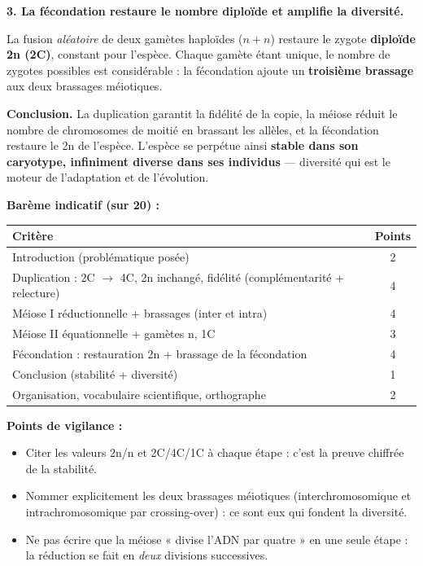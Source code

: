 \documentclass[11pt]{article}
\begin{document}
\begin{corrige}
\textbf{3. La fécondation restaure le nombre diploïde et amplifie la diversité.}

La fusion \emph{aléatoire} de deux gamètes haploïdes ($n + n$) restaure le zygote \textbf{diploïde 2n (2C)}, constant pour l'espèce. Chaque gamète étant unique, le nombre de zygotes possibles est considérable : la fécondation ajoute un \textbf{troisième brassage} aux deux brassages méiotiques.

\textbf{Conclusion.} La duplication garantit la fidélité de la copie, la méiose réduit le nombre de chromosomes de moitié en brassant les allèles, et la fécondation restaure le 2n de l'espèce. L'espèce se perpétue ainsi \textbf{stable dans son caryotype, infiniment diverse dans ses individus} — diversité qui est le moteur de l'adaptation et de l'évolution.

\textbf{Barème indicatif (sur 20) :}
\begin{center}
\begin{tabular}{|l|c|}\hline
\rowcolor{popblueL} \textbf{Critère} & \textbf{Points} \\ \hline
Introduction (problématique posée) & 2 \\ \hline
Duplication : 2C $\to$ 4C, 2n inchangé, fidélité (complémentarité + relecture) & 4 \\ \hline
Méiose I réductionnelle + brassages (inter et intra) & 4 \\ \hline
Méiose II équationnelle + gamètes n, 1C & 3 \\ \hline
Fécondation : restauration 2n + brassage de la fécondation & 4 \\ \hline
Conclusion (stabilité + diversité) & 1 \\ \hline
Organisation, vocabulaire scientifique, orthographe & 2 \\ \hline
\end{tabular}
\end{center}

\textbf{Points de vigilance :}
\begin{itemize}
    \item Citer les valeurs 2n/n et 2C/4C/1C à chaque étape : c'est la preuve chiffrée de la stabilité.
    \item Nommer explicitement les deux brassages méiotiques (interchromosomique et intrachromosomique par crossing-over) : ce sont eux qui fondent la diversité.
    \item Ne pas écrire que la méiose « divise l'ADN par quatre » en une seule étape : la réduction se fait en \emph{deux} divisions successives.
\end{itemize}
\end{corrige}
\end{document}

